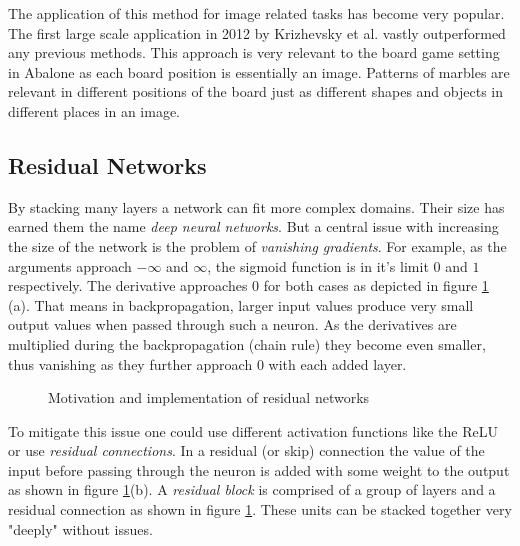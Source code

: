 The application of this method for image related tasks has become very popular. The first large scale application in 2012 by Krizhevsky et al. \cite{krizhevsky_imagenet_2017} vastly outperformed any previous methods. This approach is very relevant to the board game setting in Abalone as each board position is essentially an image. Patterns of marbles are relevant in different positions of the board just as different shapes and objects in different places in an image.

\subsection{Residual Networks}
By stacking many layers a network can fit more complex domains. Their size has earned them the name \textit{deep neural networks}. But a central issue with increasing the size of the network is the problem of \textit{vanishing gradients}. For example, as the arguments approach $-\infty$ and $\infty$, the sigmoid function is in it's limit $0$ and $1$ respectively. The derivative approaches $0$ for both cases as depicted in figure \ref{residual_network} (a). That means in backpropagation, larger input values produce very small output values when passed through such a neuron. As the derivatives are multiplied during the backpropagation (chain rule) they become even smaller, thus vanishing as they further approach $0$ with each added layer.

\begin{figure}[!h]
    \centering
    \caption{Motivation and implementation of residual networks}
    \label{residual_network}
\end{figure}

To mitigate this issue one could use different activation functions like the ReLU or use \textit{residual connections}. In a residual (or skip) connection the value of the input before passing through the neuron is added with some weight to the output as shown in figure \ref{residual_network}(b). A \textit{residual block} is comprised of a group of layers and a residual connection as shown in figure \ref{residual_network}. These units can be stacked together very "deeply" without issues.

